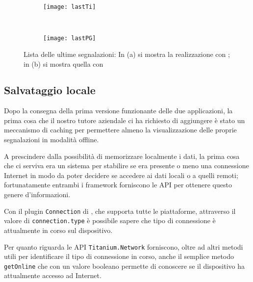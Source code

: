         \begin{figure}[h]
            \centering
            \begin{subfigure}[b]{0.485\textwidth}
                \texttt{[image: lastTi]}
                \caption{}
                \label{fig:tiLast}
            \end{subfigure}
            ~
            \begin{subfigure}[b]{0.485\textwidth}
                \texttt{[image: lastPG]}
                \caption{}
                \label{fig:kendoLast}
            \end{subfigure}
            \caption{Lista delle ultime segnalazioni:
            In (a) si mostra la realizzazione con \tisdk{}; in (b) si mostra
            quella con \kendomob{}
            }
            \label{fig:last}
        \end{figure}


        \subsection{Salvataggio locale}
        \label{subsec:caching}
            Dopo la consegna della prima versione funzionante delle due
            applicazioni, la prima cosa che il nostro tutore aziendale ci ha
            richiesto di aggiungere è stato un meccanismo di caching per
            permettere almeno la visualizzazione delle proprie segnalazioni in
            modalità offline.

            A prescindere dalla possibilità di memorizzare localmente i dati,
            la prima cosa che ci serviva era un sistema per stabilire se era
            presente o meno una connessione Internet in modo da poter
            decidere se accedere ai dati locali o a quelli remoti;
            fortunatamente entrambi i framework forniscono le API per ottenere
            questo genere d'informazioni.

            Con il plugin \texttt{Connection} di \pg{}, che supporta tutte le
            piattaforme, attraverso il valore di \texttt{connection.type} è
            possibile sapere che tipo di connessione è attualmente in corso
            sul dispositivo.

            Per quanto riguarda \tisdk{} le API \texttt{Titanium.Network}
            forniscono, oltre ad altri metodi utili per identificare il tipo di
            connessione in corso, anche il semplice metodo \texttt{getOnline}
            che con un valore booleano permette di conoscere se il dispositivo
            ha attualmente accesso ad Internet.

